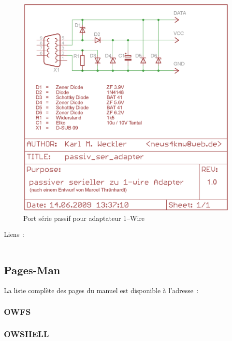 \begin{figure}[htbp]
  \centering
  \includegraphics[width=\columnwidth]{passiv_ser_adapter}
  \caption{Port série passif pour adaptateur 1--Wire}
  \label{fig:passiv_ser_adapter}
\end{figure}

Liens~:\\
 \\

\newpage

{
\subsection{Pages-Man}
}
La liste complète des pages du manuel est disponible à l'adresse~:


\subsubsection{OWFS}



\subsubsection{OWSHELL}

